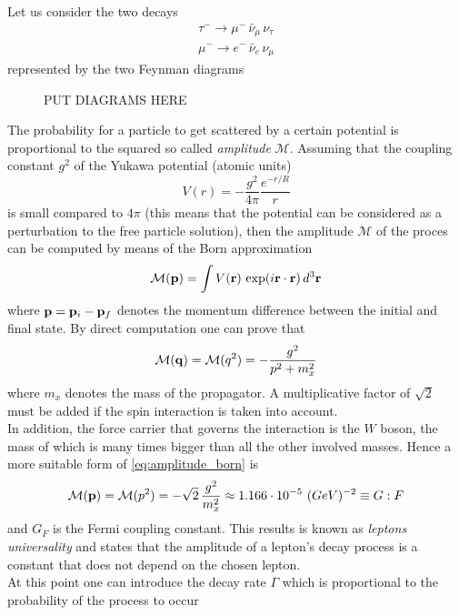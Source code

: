 Let us consider the two decays 
\begin{gather*}
    \tau^- \rightarrow \mu^- \, \bar\nu_{\mu} \, \nu_{\tau} \\
    \mu^- \rightarrow e^- \, \bar\nu_e \, \nu_{\mu}
\end{gather*}
represented by the two Feynman diagrams
\begin{figure}
    PUT DIAGRAMS HERE
\end{figure}
The probability for a particle to get scattered by a certain potential is proportional to the squared so called \emph{amplitude} $\mathcal{M}$.
Assuming that the coupling constant $g^2$ of the Yukawa potential (atomic units)
\begin{equation*}
    V(r) = -\frac{g^2}{4\pi} \frac{e^{-r/R}}{r}
\end{equation*}
is small compared to $4\pi$ (this means that the potential can be considered as a perturbation to the free particle solution), then the amplitude $\mathcal{M}$ of the proces can be computed by means of the Born approximation
\begin{equation*}
    \mathcal{M}(\mathbf{p}) = \int V(\mathbf{r}) \, \exp(i\mathbf{r}\cdot\mathbf{r}) \, d^3\mathbf{r}
\end{equation*}
where $\mathbf{p} = \mathbf{p}_i - \mathbf{p}_f$ denotes the momentum difference between the initial and final state. By direct computation one can prove that 
\begin{equation}
    \mathcal{M}(\mathbf{q}) = \mathcal{M}(q^2) = - \frac{g^2}{p^2 + m_x^2}
    \label{eq:amplitude_born}
\end{equation}
where $m_x$ denotes the mass of the propagator. A multiplicative factor of $\sqrt{2}$ must be added if the spin interaction is taken into account. \\
In addition, the force carrier that governs the interaction is the $W$ boson, the mass of which is many times bigger than all the other involved masses. Hence a more suitable form of 
\ref{eq:amplitude_born} is 
\begin{equation*}
    \mathcal{M}(\mathbf{p}) = \mathcal{M}(p^2) = - \sqrt{2} \, \frac{g^2}{m_x^2} \approx 1.166 \cdot 10^{-5}~(GeV)^{-2} \equiv G:F
\end{equation*}
and $G_F$ is the Fermi coupling constant.
This results is known as \emph{leptons universality} and states that the amplitude of a lepton's decay process is a constant that does not depend on the chosen lepton. \\
At this point one can introduce the decay rate $\Gamma$ which is proportional to the probability of the process to occur
